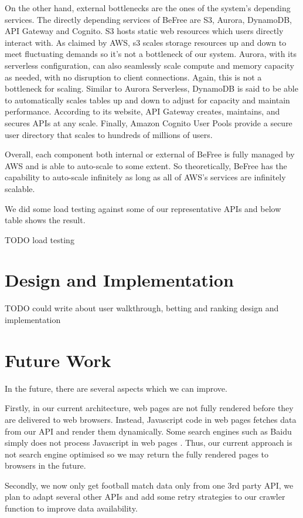 \documentclass[conference]{IEEEtran}
\begin{document}
On the other hand, external bottlenecks are the ones of the system's depending services. The directly depending services of BeFree are S3, Aurora, DynamoDB, API Gateway and Cognito. S3 hosts static web resources which users directly interact with. As claimed by AWS, s3 scales storage resources up and down to meet fluctuating demands so it's not a bottleneck of our system. Aurora, with its serverless configuration, can also seamlessly scale compute and memory capacity as needed, with no disruption to client connections. Again, this is not a bottleneck for scaling. Similar to Aurora Serverless, DynamoDB is said to be able to automatically scales tables up and down to adjust for capacity and maintain performance. According to its website, API Gateway creates, maintains, and secures APIs at any scale. Finally, Amazon Cognito User Pools provide a secure user directory that scales to hundreds of millions of users.

Overall, each component both internal or external of BeFree is fully managed by AWS and is able to auto-scale to some extent. So theoretically, BeFree has the capability to auto-scale infinitely as long as all of AWS's services are infinitely scalable.

We did some load testing against some of our representative APIs and below table shows the result.

TODO load testing


\section{Design and Implementation}
TODO could write about user walkthrough, betting and ranking design and implementation

\section{Future Work}
In the future, there are several aspects which we can improve.

Firstly, in our current architecture, web pages are not fully rendered before they are delivered to web browsers. Instead, Javascript code in web pages fetches data from our API and render them dynamically. Some search engines such as Baidu simply does not process Javascript in web pages \cite{b17}. Thus, our current approach is not search engine optimised so we may return the fully rendered pages to browsers in the future.

Secondly, we now only get football match data only from one 3rd party API, we plan to adapt several other APIs and add some retry strategies to our crawler function to improve data availability.
\end{document}
